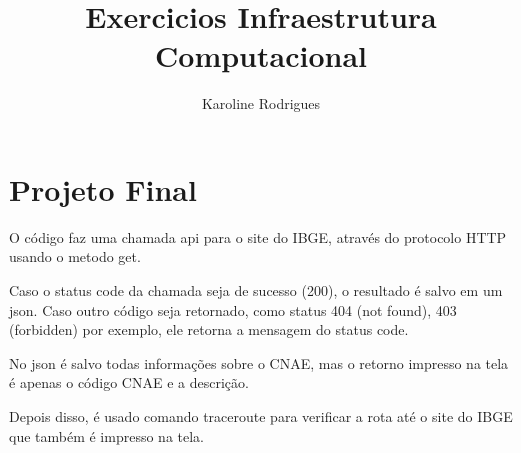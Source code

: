 \documentclass[12pt]{article}
\title{Exercicios Infraestrutura Computacional }
\author{Karoline Rodrigues}
\begin{document}
\normalsize
\maketitle
\section{Projeto Final}
\label{sec:projetofinal}
    O código faz uma chamada api para o site do IBGE,
    através do protocolo HTTP usando o metodo get.

    Caso o status code da chamada seja de sucesso (200), 
    o resultado é salvo em um json. Caso outro código seja retornado,
    como status 404 (not found), 403 (forbidden) por exemplo,
    ele retorna a mensagem do status code.

    No json é salvo todas informações sobre o CNAE,
    mas o retorno impresso na tela é apenas o código CNAE e a descrição.

    Depois disso, é usado comando traceroute para verificar a rota
    até o site do IBGE que também é impresso na tela.
\end{document}

